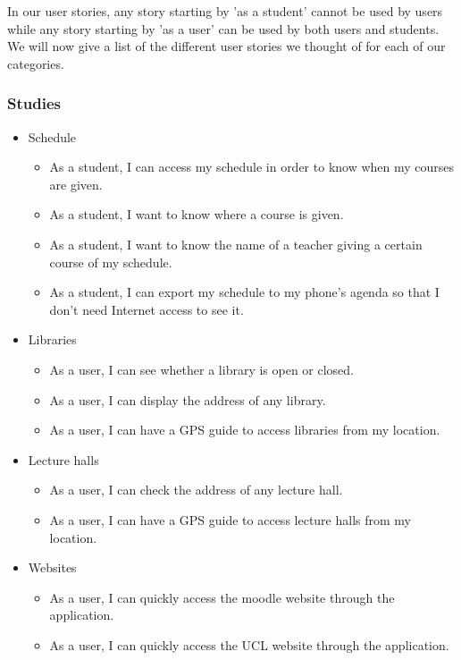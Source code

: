 \documentclass[11pt, a4paper]{report}
\begin{document}
In our user stories, any story starting by 'as a student' cannot be used by users while any story starting by 'as a user' can be used by both users and students.\\

We will now give a list of the different user stories we thought of for each of our categories.

\subsubsection{Studies}

\begin{itemize}

\item Schedule
\begin{itemize}
\item As a student, I can access my schedule in order to know when my courses are given.
\item As a student, I want to know where a course is given.
\item As a student, I want to know the name of a teacher giving a certain course of my schedule.
\item As a student, I can export my schedule to my phone's agenda so that I don't need Internet access to see it.
\end{itemize}

\item Libraries
\begin{itemize}
\item As a user, I can see whether a library is open or closed.
\item As a user, I can display the address of any library.
\item As a user, I can have a GPS guide to access libraries from my location.
\end{itemize}

\item Lecture halls
\begin{itemize}
\item As a user, I can check the address of any lecture hall.
\item As a user, I can have a GPS guide to access lecture halls from my location.
\end{itemize}

\item Websites
\begin{itemize}
\item As a user, I can quickly access the moodle website through the application.
\item As a user, I can quickly access the UCL website through the application.
\end{itemize}

\end{itemize}
\end{document}
